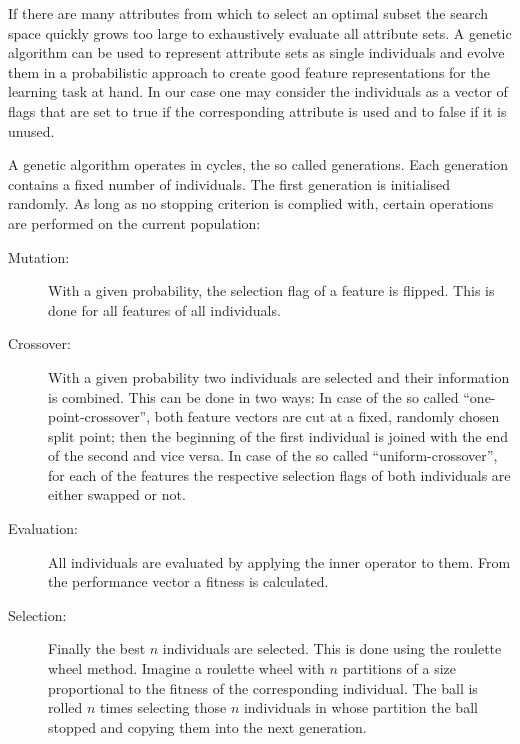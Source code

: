 \begin{values}
\featureoperatorvalues
\end{values}

\opdescr If there are many attributes from which to select an
optimal subset the search space quickly grows too large to
exhaustively evaluate all attribute sets. A genetic algorithm can be
used to represent attribute sets as single individuals and evolve them
in a probabilistic approach to create good feature representations for
the learning task at hand. In our case one may consider the
individuals as a vector of flags that are set to true if the
corresponding attribute is used and to false if it is unused.

A genetic algorithm operates in cycles, the so called generations. Each 
generation contains a fixed number of individuals. The first
generation is initialised randomly. As long as no stopping criterion
is complied with, certain operations are performed on the current
population:
\begin{description}
\item[Mutation:] With a given probability, the selection flag of a feature is flipped. 
This is done for all features of all individuals.
\item[Crossover:] With a given probability two individuals are selected
  and their information is combined. This can be done in two ways: In
  case of the so called ``one-point-crossover'', both feature vectors
  are cut at a fixed, randomly chosen split point; then the beginning of
  the first individual is joined with the end of the second and vice
  versa. In case of the so called ``uniform-crossover'', for each of the
  features the respective selection flags of both individuals are
  either swapped or not.
\item[Evaluation:] All individuals are evaluated by applying the inner
  operator to them. From the performance vector a fitness is calculated.
\item[Selection:] Finally the best $n$ individuals are selected. This is
  done using the roulette wheel method. Imagine a roulette wheel with
  $n$ partitions of a size proportional to the fitness of the corresponding individual. 
  The ball is rolled $n$ times selecting those $n$
  individuals in whose partition the ball stopped and copying them
  into the next generation.
\end{description}



